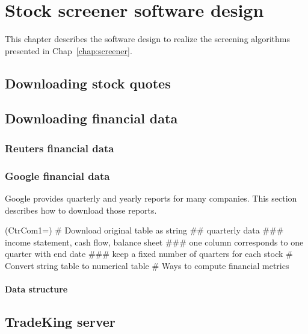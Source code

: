 \chapter{Stock screener software design}
\label{chap:design}

This chapter describes the software design to realize the screening algorithms presented in Chap~\ref{chap:screener}. 

\section{Downloading stock quotes}
\section{Downloading financial data}
\subsection{Reuters financial data}
\subsection{Google financial data}
Google provides quarterly and yearly reports for many companies. This section describes how to download those reports. 

\begin{listb}
\ListProperties(CtrCom1=)
# Download original table as string
  ## quarterly data
     ### income statement, cash flow, balance sheet
     ### one column corresponds to one quarter with end date
     ### keep a fixed number of quarters for each stock
# Convert string table to numerical table
# Ways to compute financial metrics
\end{listb}

\subsubsection{Data structure}


\section{TradeKing server}

